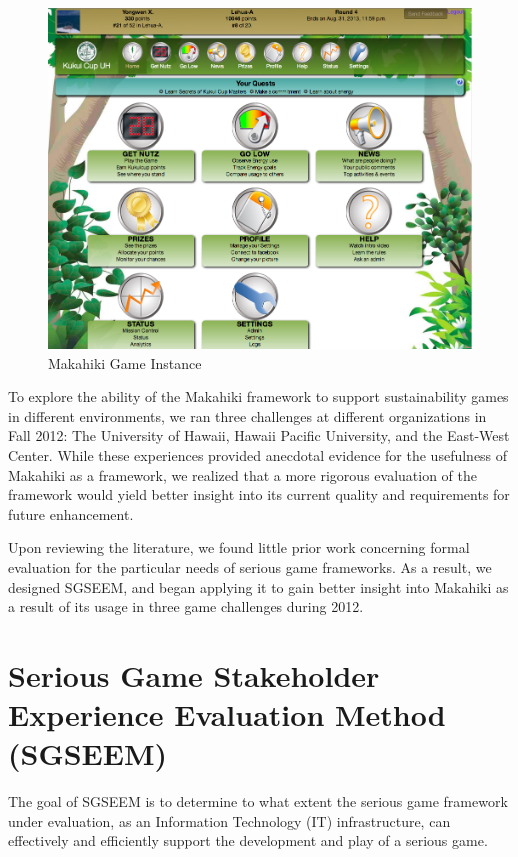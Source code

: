 \documentclass{sigchi}
\begin{document}
\begin{figure}[ht!]
  \center
  \includegraphics[width=\columnwidth]{kukuicup-home}
  \caption{Makahiki Game Instance}
  \label{fig:Makahiki-Home-Page}
\end{figure}

To explore the ability of the Makahiki framework to support
sustainability games in different environments, we ran three
challenges at different organizations in Fall 2012: The University of
Hawaii, Hawaii Pacific University, and the East-West Center. While
these experiences provided anecdotal evidence for the usefulness of
Makahiki as a framework, we realized that a more rigorous evaluation of the framework
would yield better insight into its current quality and requirements
for future enhancement.

Upon reviewing the literature, we found little prior work concerning formal evaluation for
the particular needs of serious game frameworks. As a result, we designed SGSEEM, and
began applying it to gain better insight into Makahiki as a result of its usage in three
game challenges during 2012.

\section{Serious Game Stakeholder Experience Evaluation Method (SGSEEM)}

The goal of SGSEEM is to determine to what extent the serious game
framework under evaluation, as an Information Technology (IT)
infrastructure, can effectively and efficiently support the
development and play of a serious game.
\end{document}
